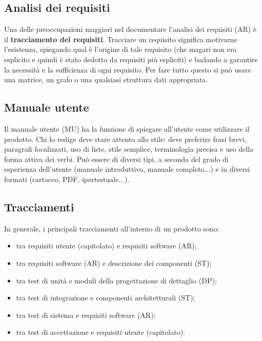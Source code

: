\documentclass[a4paper]{article}
\begin{document}
		
	\subsection{Analisi dei requisiti}

		
Una delle preoccupazioni maggiori nel documentare l'analisi dei requisiti (AR) è il \textbf{tracciamento dei requisiti}. Tracciare un requisito significa motivarne l'esistenza, spiegando qual è l'origine di tale requisito (che magari non era esplicito e quindi è stato dedotto da requisiti più espliciti) e badando a garantire la necessità e la sufficienza di ogni requisito. Per fare tutto questo si può usare una matrice, un grafo o una qualsiasi struttura dati appropriata.

		
	\subsection{Manuale utente}

		
Il manuale utente (MU) ha la funzione di spiegare all'utente come utilizzare il prodotto. Chi lo redige deve stare attento allo stile: deve preferire frasi brevi, paragrafi focalizzati, uso di liste, stile semplice, terminologia precisa e uso della forma attiva dei verbi. Può essere di diversi tipi, a seconda del grado di esperienza dell'utente (manuale introduttivo, manuale completo...) e in diversi formati (cartaceo, PDF, ipertestuale...).

		
	\subsection{Tracciamenti}

		
In generale, i principali tracciamenti all'interno di un prodotto sono:
		
	\begin{itemize}
		
			
	\item tra requisiti utente (capitolato) e requisiti software (AR);
			
	\item tra requisiti software (AR) e descrizione dei componenti (ST);
			
	\item tra test di unità e moduli della progettazione di dettaglio (DP);
			
	\item tra test di integrazione e componenti architetturali (ST);
			
	\item tra test di sistema e requisiti software (AR);
			
	\item tra test di accettazione e requisiti utente (capitolato).
		
	\end{itemize}
\end{document}
